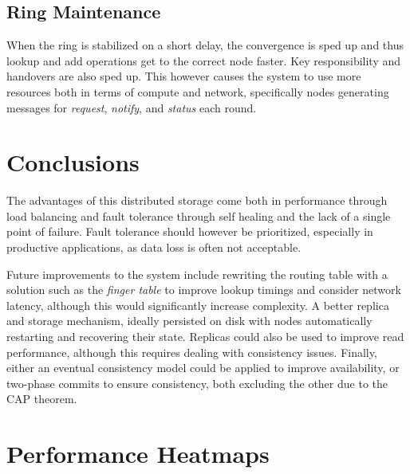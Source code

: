 \documentclass[a4paper, 11pt]{article}
\begin{document}
\subsection{Ring Maintenance}

When the ring is stabilized on a short delay, the convergence is sped up and thus lookup and add operations get to the correct node faster. Key responsibility and handovers are also sped up.
This however causes the system to use more resources both in terms of compute and network, specifically nodes generating messages for \textit{request}, \textit{notify}, and \textit{status} each round.

\section{Conclusions}

The advantages of this distributed storage come both in performance through load balancing and fault tolerance through self healing and the lack of a single point of failure.
Fault tolerance should however be prioritized, especially in productive applications, as data loss is often not acceptable.

Future improvements to the system include rewriting the routing table with a solution such as the \textit{finger table} to improve lookup timings and consider network latency, although this would significantly increase complexity.
A better replica and storage mechanism, ideally persisted on disk with nodes automatically restarting and recovering their state. Replicas could also be used to improve read performance, although this requires dealing with consistency issues.
Finally, either an eventual consistency model could be applied to improve availability, or two-phase commits to ensure consistency, both excluding the other due to the CAP theorem.

\newpage

\appendix

\section{Performance Heatmaps}
\end{document}
